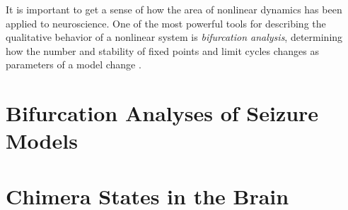It is important to get a sense of how the area of nonlinear dynamics has been applied to neuroscience.
One of the most powerful tools for describing the qualitative behavior of a nonlinear system is \textit{bifurcation analysis}, determining how the number and stability of fixed points and limit cycles changes as parameters of a model change \cite{Strogatz2015}.
\section{Bifurcation Analyses of Seizure Models}
\label{sec:lit_review_bifurcation}


\section{Chimera States in the Brain}
\label{sec:lit_review_chimera}

